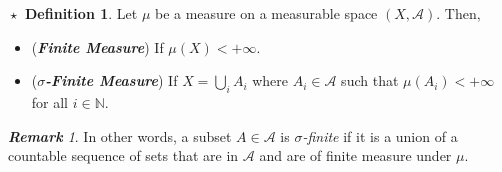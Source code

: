 \documentclass{article}
\theoremstyle{definition}
\newtheorem{definition}{$\boxed{\star}$ Definition}
\theoremstyle{remark}
\newtheorem*{remark}{\textbf{Remark}}
\theoremstyle{definition}
\theoremstyle{definition}
\theoremstyle{definition}
\newcommand{\bunion}{\bigcup}
\newcommand{\N}{\mathbb{N}}
\newcommand{\alg}[1]{\mathscr{#1}}
\begin{document}
\hrulefill
\begin{definition}
	Let $ \mu $ be a measure on a measurable space $ (X,\alg{A}) $. Then,
	\begin{itemize}
		\item {(\textbf{\emph{Finite Measure}}) If $ \mu(X)< +\infty $.}
		\item {(\textbf{\emph{$ \sigma $-Finite Measure}}) If $ X = \bunion_{i}A_i $ where $ A_i \in\alg{A} $ such that $ \mu(A_i)< +\infty $ for all $ i\in \N $.}
	\end{itemize}
\end{definition}
\begin{remark}
	In other words, a subset $ A\in\alg{A} $ is \emph{$ \sigma $-finite} if it is a union of a countable sequence of sets that are in $ \alg{A} $ and are of finite measure under $ \mu $.
\end{remark}
\hrulefill
\end{document}
